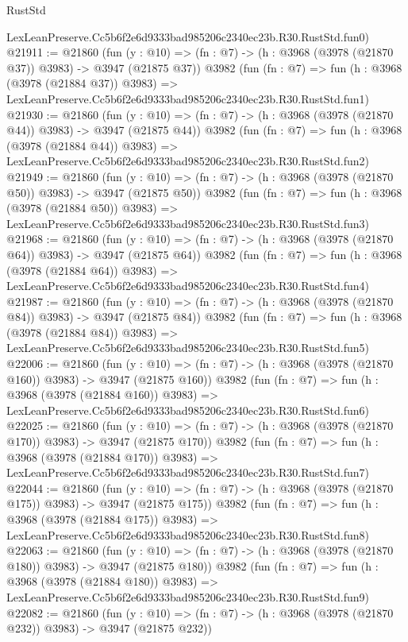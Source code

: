 \begin{lexlean}{RustStd}
\begin{coremodule}
    LexLeanPreserve.Cc5b6f2e6d9333bad985206c2340ec23b.R30.RustStd.fun0)
@21911 := @21860
    (fun (y : @10) => (fn : @7) -> (h : @3968 (@3978 (@21870 @37)) @3983) -> @3947 (@21875 @37))
    @3982
    (fun (fn : @7) =>
    fun (h : @3968 (@3978 (@21884 @37)) @3983) =>
    LexLeanPreserve.Cc5b6f2e6d9333bad985206c2340ec23b.R30.RustStd.fun1)
@21930 := @21860
    (fun (y : @10) => (fn : @7) -> (h : @3968 (@3978 (@21870 @44)) @3983) -> @3947 (@21875 @44))
    @3982
    (fun (fn : @7) =>
    fun (h : @3968 (@3978 (@21884 @44)) @3983) =>
    LexLeanPreserve.Cc5b6f2e6d9333bad985206c2340ec23b.R30.RustStd.fun2)
@21949 := @21860
    (fun (y : @10) => (fn : @7) -> (h : @3968 (@3978 (@21870 @50)) @3983) -> @3947 (@21875 @50))
    @3982
    (fun (fn : @7) =>
    fun (h : @3968 (@3978 (@21884 @50)) @3983) =>
    LexLeanPreserve.Cc5b6f2e6d9333bad985206c2340ec23b.R30.RustStd.fun3)
@21968 := @21860
    (fun (y : @10) => (fn : @7) -> (h : @3968 (@3978 (@21870 @64)) @3983) -> @3947 (@21875 @64))
    @3982
    (fun (fn : @7) =>
    fun (h : @3968 (@3978 (@21884 @64)) @3983) =>
    LexLeanPreserve.Cc5b6f2e6d9333bad985206c2340ec23b.R30.RustStd.fun4)
@21987 := @21860
    (fun (y : @10) => (fn : @7) -> (h : @3968 (@3978 (@21870 @84)) @3983) -> @3947 (@21875 @84))
    @3982
    (fun (fn : @7) =>
    fun (h : @3968 (@3978 (@21884 @84)) @3983) =>
    LexLeanPreserve.Cc5b6f2e6d9333bad985206c2340ec23b.R30.RustStd.fun5)
@22006 := @21860
    (fun (y : @10) => (fn : @7) -> (h : @3968 (@3978 (@21870 @160)) @3983) -> @3947 (@21875 @160))
    @3982
    (fun (fn : @7) =>
    fun (h : @3968 (@3978 (@21884 @160)) @3983) =>
    LexLeanPreserve.Cc5b6f2e6d9333bad985206c2340ec23b.R30.RustStd.fun6)
@22025 := @21860
    (fun (y : @10) => (fn : @7) -> (h : @3968 (@3978 (@21870 @170)) @3983) -> @3947 (@21875 @170))
    @3982
    (fun (fn : @7) =>
    fun (h : @3968 (@3978 (@21884 @170)) @3983) =>
    LexLeanPreserve.Cc5b6f2e6d9333bad985206c2340ec23b.R30.RustStd.fun7)
@22044 := @21860
    (fun (y : @10) => (fn : @7) -> (h : @3968 (@3978 (@21870 @175)) @3983) -> @3947 (@21875 @175))
    @3982
    (fun (fn : @7) =>
    fun (h : @3968 (@3978 (@21884 @175)) @3983) =>
    LexLeanPreserve.Cc5b6f2e6d9333bad985206c2340ec23b.R30.RustStd.fun8)
@22063 := @21860
    (fun (y : @10) => (fn : @7) -> (h : @3968 (@3978 (@21870 @180)) @3983) -> @3947 (@21875 @180))
    @3982
    (fun (fn : @7) =>
    fun (h : @3968 (@3978 (@21884 @180)) @3983) =>
    LexLeanPreserve.Cc5b6f2e6d9333bad985206c2340ec23b.R30.RustStd.fun9)
@22082 := @21860
    (fun (y : @10) => (fn : @7) -> (h : @3968 (@3978 (@21870 @232)) @3983) -> @3947 (@21875 @232))

\end{coremodule}
\end{lexlean}
